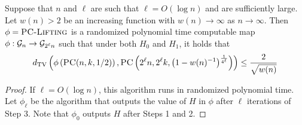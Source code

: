 \begin{lemma} \label{lem:4b}
Suppose that $n$ and $\ell$ are such that $\ell = O(\log n)$ and are sufficiently large. Let $w(n) > 2$ be an increasing function with $w(n) \to \infty$ as $n \to \infty$. Then $\phi = \textsc{PC-Lifting}$ is a randomized polynomial time computable map $\phi : \mathcal{G}_n \to \mathcal{G}_{2^\ell n}$ such that under both $H_0$ and $H_1$, it holds that
$$d_{\text{TV}}\left( \phi\left(\textsc{PC}(n, k, 1/2)\right), \textsc{PC}\left(2^\ell n, 2^\ell k, \left(1 -w(n)^{-1}\right)^{\frac{1}{4^\ell}}\right) \right) \le \frac{2}{\sqrt{w(n)}}$$
\end{lemma}

\begin{proof}
If $\ell = O(\log n)$, this algorithm runs in randomized polynomial time. Let $\phi_\ell$ be the algorithm that outputs the value of $H$ in $\phi$ after $\ell$ iterations of Step 3. Note that $\phi_0$ outputs $H$ after Steps 1 and 2.


\end{proof}
